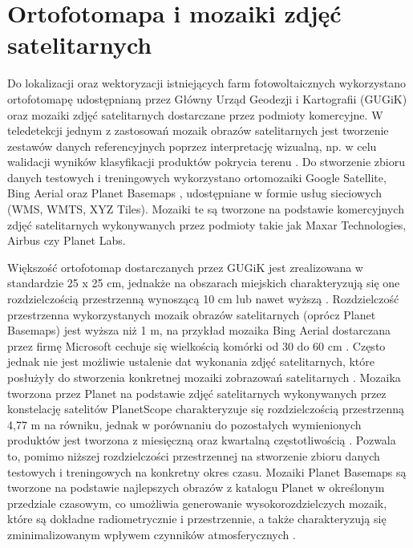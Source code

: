 \documentclass{amuthesis}
\begin{document}
\hypertarget{sec-mosaics}{%
\section{Ortofotomapa i mozaiki zdjęć satelitarnych}\label{sec-mosaics}}

Do lokalizacji oraz wektoryzacji istniejących farm fotowoltaicznych
wykorzystano ortofotomapę udostępnianą przez Główny Urząd Geodezji i
Kartografii (GUGiK) oraz mozaiki zdjęć satelitarnych dostarczane przez
podmioty komercyjne. W teledetekcji jednym z zastosowań mozaik obrazów
satelitarnych jest tworzenie zestawów danych referencyjnych poprzez
interpretację wizualną, np. w celu walidacji wyników klasyfikacji
produktów pokrycia terenu \autocite{lesiv_2018_sat_imagery_mosaics}. Do
stworzenie zbioru danych testowych i treningowych wykorzystano
ortomozaiki Google Satellite, Bing Aerial oraz Planet Basemaps
\autocite{planet}, udostępniane w formie usług sieciowych (WMS, WMTS,
XYZ Tiles). Mozaiki te są tworzone na podstawie komercyjnych zdjęć
satelitarnych wykonywanych przez podmioty takie jak Maxar Technologies,
Airbus czy Planet Labs.

Większość ortofotomap dostarczanych przez GUGiK jest zrealizowana w
standardzie 25 x 25 cm, jednakże na obszarach miejskich charakteryzują
się one rozdzielczością przestrzenną wynoszącą 10 cm lub nawet wyższą
\autocite{ortofotomapa}. Rozdzielczość przestrzenna wykorzystanych
mozaik obrazów satelitarnych (oprócz Planet Basemaps) jest wyższa niż 1
m, na przykład mozaika Bing Aerial dostarczana przez firmę Microsoft
cechuje się wielkością komórki od 30 do 60 cm \autocite{bing_aerial}.
Często jednak nie jest możliwie ustalenie dat wykonania zdjęć
satelitarnych, które posłużyły do stworzenia konkretnej mozaiki
zobrazowań satelitarnych \autocite{lesiv_2018_sat_imagery_mosaics}.
Mozaika tworzona przez Planet na podstawie zdjęć satelitarnych
wykonywanych przez konstelację satelitów PlanetScope charakteryzuje się
rozdzielczością przestrzenną 4,77 m na równiku, jednak w porównaniu do
pozostałych wymienionych produktów jest tworzona z miesięczną oraz
kwartalną częstotliwością \autocite{planet_2019_basemaps}. Pozwala to,
pomimo niższej rozdzielczości przestrzennej na stworzenie zbioru danych
testowych i treningowych na konkretny okres czasu. Mozaiki Planet
Basemaps \autocite{planet} są tworzone na podstawie najlepszych obrazów
z katalogu Planet w określonym przedziale czasowym, co umożliwia
generowanie wysokorozdzielczych mozaik, które są dokładne
radiometrycznie i przestrzennie, a także charakteryzują się
zminimalizowanym wpływem czynników atmosferycznych
\autocite{planet_2019_basemaps}.
\end{document}
